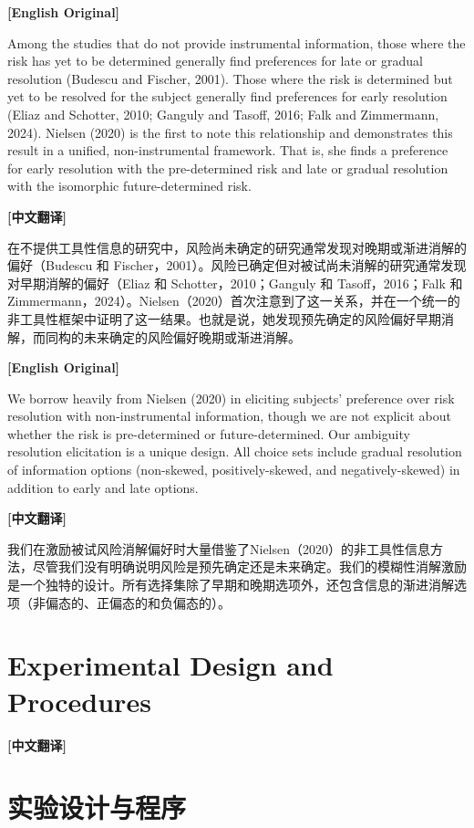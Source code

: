 \documentclass[12pt,a4paper]{ctexart}
\newenvironment{original}{%
  \par\medskip\noindent\textbf{[English Original]}\par\smallskip
  \color{black}\small
}{%
  \par\medskip
}
\newenvironment{translation}{%
  \par\noindent\textbf{[中文翻译]}\par\smallskip
  \color{blue}\small
}{%
  \par\bigskip
}
\theoremstyle{definition}
\theoremstyle{remark}
\begin{document}
\begin{original}
Among the studies that do not provide instrumental information, those where the risk has yet to be determined generally find preferences for late or gradual resolution (Budescu and Fischer, 2001). Those where the risk is determined but yet to be resolved for the subject generally find preferences for early resolution (Eliaz and Schotter, 2010; Ganguly and Tasoff, 2016; Falk and Zimmermann, 2024). Nielsen (2020) is the first to note this relationship and demonstrates this result in a unified, non-instrumental framework. That is, she finds a preference for early resolution with the pre-determined risk and late or gradual resolution with the isomorphic future-determined risk.
\end{original}
\begin{translation}
在不提供工具性信息的研究中，风险尚未确定的研究通常发现对晚期或渐进消解的偏好（Budescu 和 Fischer，2001）。风险已确定但对被试尚未消解的研究通常发现对早期消解的偏好（Eliaz 和 Schotter，2010；Ganguly 和 Tasoff，2016；Falk 和 Zimmermann，2024）。Nielsen（2020）首次注意到了这一关系，并在一个统一的非工具性框架中证明了这一结果。也就是说，她发现预先确定的风险偏好早期消解，而同构的未来确定的风险偏好晚期或渐进消解。
\end{translation}

\begin{original}
We borrow heavily from Nielsen (2020) in eliciting subjects' preference over risk resolution with non-instrumental information, though we are not explicit about whether the risk is pre-determined or future-determined. Our ambiguity resolution elicitation is a unique design. All choice sets include gradual resolution of information options (non-skewed, positively-skewed, and negatively-skewed) in addition to early and late options.
\end{original}
\begin{translation}
我们在激励被试风险消解偏好时大量借鉴了Nielsen（2020）的非工具性信息方法，尽管我们没有明确说明风险是预先确定还是未来确定。我们的模糊性消解激励是一个独特的设计。所有选择集除了早期和晚期选项外，还包含信息的渐进消解选项（非偏态的、正偏态的和负偏态的）。
\end{translation}

\newpage

\section{Experimental Design and Procedures}
\begin{translation}
\section*{实验设计与程序}
\end{translation}
\end{document}
